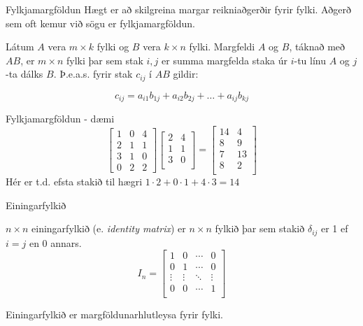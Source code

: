 \documentclass[handout]{beamer}
\begin{document}
\begin{frame}{Fylkjamargföldun}
Hægt er að skilgreina margar reikniaðgerðir fyrir fylki. Aðgerð sem oft kemur við sögu er fylkjamargföldun.

\begin{tcolorbox}[title=Fylkjamargföldun]
Látum $A$ vera $m \times k$ fylki og $B$ vera $k \times n$ fylki. Margfeldi $A$ og $B$, táknað með $AB$, er $m \times n$ fylki þar sem stak $i, j$ er summa margfelda staka úr $i$-tu línu $A$ og $j$-ta dálks $B$. Þ.e.a.s. fyrir stak $c_{ij}$ í $AB$ gildir:

\[
 c_{ij} = a_{i1}b_{1j} + a_{i2}b_{2j} + \ldots + a_{ij}b_{kj}
\]
\end{tcolorbox}
\end{frame}

\begin{frame}{Fylkjamargföldun - dæmi}
\[
\begin{bmatrix}
1&0&4\\2&1&1\\3&1&0\\0&2&2
\end{bmatrix}
\begin{bmatrix}
2&4\\
1&1\\
3&0\\
\end{bmatrix}
=
\begin{bmatrix}
14&4\\
8&9\\
7&13\\
8&2\\
\end{bmatrix}
\]
Hér er t.d. efsta stakið til hægri $1\cdot 2 + 0\cdot 1 + 4\cdot 3 = 14$
\end{frame}

\begin{frame}{Einingarfylkið}
    \begin{tcolorbox}[title=Einingarfylkið]
        $n \times n$ einingarfylkið (e. \emph{identity matrix}) er $n \times n$ fylkið þar sem stakið $\delta_{ij}$ er 1 ef $i = j$ en 0 annars.
        \[
            I_n =
            \begin{bmatrix}
                1&0&\cdots&0\\
                0&1&\cdots&0\\
                \vdots&\vdots&\ddots&\vdots\\
                0&0&\cdots&1\\
            \end{bmatrix}
        \]
    \end{tcolorbox} 
    
    Einingarfylkið er margföldunarhlutleysa fyrir fylki.
\end{frame}
\end{document}
